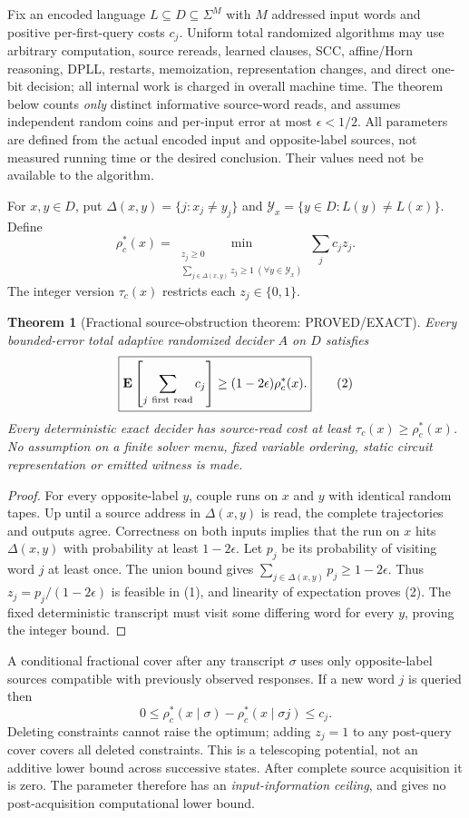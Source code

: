 \documentclass[11pt]{article}
\newtheorem{theorem}{Theorem}
\begin{document}
Fix an encoded language $L\subseteq D\subseteq\Sigma^M$ with $M$ addressed input words and positive per-first-query costs $c_j$. Uniform total randomized algorithms may use arbitrary computation, source rereads, learned clauses, SCC, affine/Horn reasoning, DPLL, restarts, memoization, representation changes, and direct one-bit decision; all internal work is charged in overall machine time. The theorem below counts \emph{only} distinct informative source-word reads, and assumes independent random coins and per-input error at most $\epsilon<1/2$. All parameters are defined from the actual encoded input and opposite-label sources, not measured running time or the desired conclusion. Their values need not be available to the algorithm.

For $x,y\in D$, put $\Delta(x,y)=\{j:x_j\ne y_j\}$ and $\mathcal Y_x=\{y\in D:L(y)\ne L(x)\}$. Define
\[
\rho_c^*(x)=\min_{\substack{z_j\ge0\\
\sum_{j\in\Delta(x,y)}z_j\ge1\ (\forall y\in\mathcal Y_x)}}\sum_j c_j z_j.
\tag{1}
\]
The integer version $\tau_c(x)$ restricts each $z_j\in\{0,1\}$.
\begin{theorem}[Fractional source-obstruction theorem: PROVED/EXACT]
Every bounded-error total adaptive randomized decider $A$ on $D$ satisfies
\[
\boxed{\mathbf E\left[\sum_{j\ {\rm first\ read}}c_j\right]\ge
(1-2\epsilon)\rho_c^*(x).}
\tag{2}
\]
Every deterministic exact decider has source-read cost at least $\tau_c(x)\ge\rho_c^*(x)$. No assumption on a finite solver menu, fixed variable ordering, static circuit representation or emitted witness is made.
\end{theorem}
\begin{proof}
For every opposite-label $y$, couple runs on $x$ and $y$ with identical random tapes. Up until a source address in $\Delta(x,y)$ is read, the complete trajectories and outputs agree. Correctness on both inputs implies that the run on $x$ hits $\Delta(x,y)$ with probability at least $1-2\epsilon$. Let $p_j$ be its probability of visiting word $j$ at least once. The union bound gives $\sum_{j\in\Delta(x,y)}p_j\ge1-2\epsilon$. Thus $z_j=p_j/(1-2\epsilon)$ is feasible in (1), and linearity of expectation proves (2). The fixed deterministic transcript must visit some differing word for every $y$, proving the integer bound.
\end{proof}
A conditional fractional cover after any transcript $\sigma$ uses only opposite-label sources compatible with previously observed responses. If a new word $j$ is queried then
\[
0\le\rho_c^*(x\mid\sigma)-\rho_c^*(x\mid\sigma j)\le c_j.
\tag{3}
\]
Deleting constraints cannot raise the optimum; adding $z_j=1$ to any post-query cover covers all deleted constraints. This is a telescoping potential, not an additive lower bound across successive states. After complete source acquisition it is zero. The parameter therefore has an \emph{input-information ceiling}, and gives no post-acquisition computational lower bound.
\end{document}
